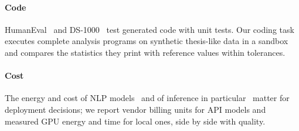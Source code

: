 \paragraph{Code} HumanEval~\cite{chen2021codex} and DS-1000~\cite{lai2023ds1000} test generated code with unit tests. Our coding task executes complete analysis programs on synthetic thesis-like data in a sandbox and compares the statistics they print with reference values within tolerances.

\paragraph{Cost} The energy and cost of NLP models~\cite{strubell2019energy} and of inference in particular~\cite{luccioni2024power} matter for deployment decisions; we report vendor billing units for API models and measured GPU energy and time for local ones, side by side with quality.
